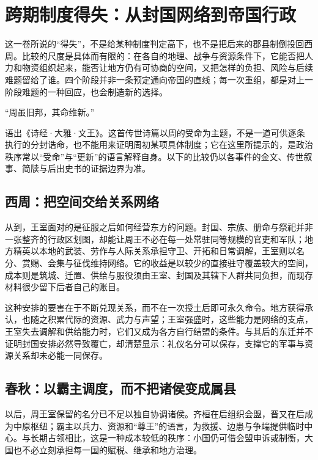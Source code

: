 \section{跨期制度得失：从封国网络到帝国行政}

这一卷所说的“得失”，不是给某种制度判定高下，也不是把后来的郡县制倒投回西周。比较的尺度是具体而有限的：在各自的地理、战争与资源条件下，它能否把人力和物资组织起来，能否让地方仍有可协商的空间，又把怎样的负担、风险与后续难题留给了谁。四个阶段并非一条预定通向帝国的直线；每一次重组，都是对上一阶段难题的一种回应，也会制造新的选择。

\begin{textwindow}[《诗经》里的“维新”]
“周虽旧邦，其命维新。”

语出《诗经·大雅·文王》。这首传世诗篇以周的受命为主题，不是一道可供逐条执行的分封诰命，也不能用来证明周初某项具体制度；它在这里所提示的，是政治秩序常以“受命”与“更新”的语言解释自身。以下的比较仍以各事件的金文、传世叙事、简牍与后出史书的证据边界为准。
\end{textwindow}

\subsection{西周：把空间交给关系网络}

从到，王室面对的是征服之后如何经营东方的问题。封国、宗族、册命与祭祀并非一张整齐的行政区划图，却能让周王不必在每一处常驻同等规模的官吏和军队；地方精英以本地的武装、劳作与人际关系承担守卫、开拓和日常调解，王室则以名分、赏赐、会集与征伐维持网络。它的收益是以较少的直接驻守覆盖较大的空间，成本则是筑城、迁置、供给与服役须由王室、封国及其辖下人群共同负担，而现存材料很少留下后者自己的账目。

这种安排的要害在于不断兑现关系，而不在一次授土后即可永久命令。地方获得承认，也随之积累代际的资源、武力与声望；王室强盛时，这些能力是网络的支点，王室失去调解和供给能力时，它们又成为各方自行结盟的条件。与其后的东迁并不证明封国安排必然导致覆亡，却清楚显示：礼仪名分可以保存，支撑它的军事与资源关系却未必能一同保存。

\subsection{春秋：以霸主调度，而不把诸侯变成属县}

以后，周王室保留的名分已不足以独自协调诸侯。齐桓在后组织会盟，晋又在后成为中原枢纽；霸主以兵力、资源和“尊王”的语言，为救援、边患与争端提供临时中心。与长期占领相比，这是一种成本较低的秩序：小国仍可借会盟申诉或制衡，大国也不必立刻承担每一国的赋税、继承和地方治理。

